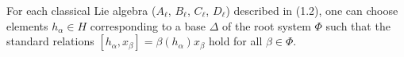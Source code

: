 For each classical Lie algebra ($A_\ell$, $B_\ell$, $C_\ell$, $D_\ell$) described in (1.2), one can choose elements $h_\alpha \in H$ corresponding to a base $\Delta$ of the root system $\Phi$ such that the standard relations $[h_\alpha, x_\beta] = \beta(h_\alpha) x_\beta$ hold for all $\beta \in \Phi$.

